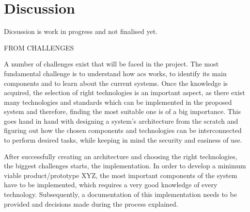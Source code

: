 \section{Discussion}\label{sec:discussion}
Dicsussion is work in progress and not finalised yet.

FROM CHALLENGES

A number of challenges exist that will be faced in the project. The most fundamental challenge is to understand how \acrshort{acs} works, to identify its main components and to learn about the current systems. Once the knowledge is acquired, the selection of right technologies is an important aspect, as there exist many technologies and standards which can be implemented in the proposed system and therefore, finding the most suitable one is of a big importance. This goes hand in hand with designing a system’s architecture from the scratch and figuring out how the chosen components and technologies can be interconnected to perform desired tasks, while keeping in mind the security and easiness of use.

After successfully creating an architecture and choosing the right technologies, the biggest challenges starts, the implementation. In order to develop a minimum viable product/prototype XYZ, the most important components of the system have to be implemented, which requires a very good knowledge of every technology. Subsequently, a documentation of this implementation needs to be provided and decisions made during the process explained.

